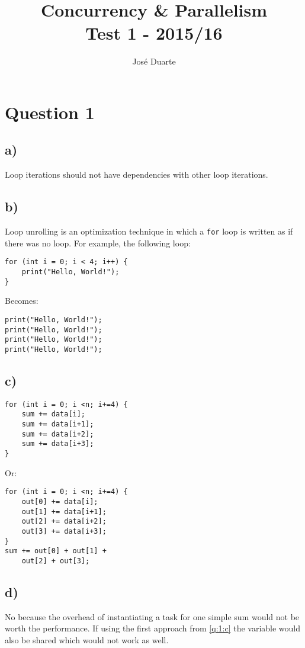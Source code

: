 \documentclass[a4paper, twocolumn]{article}
\author{José Duarte}
\title{Concurrency \& Parallelism\\Test 1 - 2015/16}
\begin{document}
\maketitle
\section{Question 1}
\subsection{a)}
Loop iterations should not have dependencies with other loop iterations.

\subsection{b)}
Loop unrolling is an optimization technique in which a \texttt{for} loop is written as if there was no loop.
For example, the following loop:
\begin{lstlisting}
for (int i = 0; i < 4; i++) {
    print("Hello, World!");
}
\end{lstlisting}
Becomes:
\begin{lstlisting}
print("Hello, World!");
print("Hello, World!");
print("Hello, World!");
print("Hello, World!");
\end{lstlisting}

\subsection{c)}\label{q:1:c}
\begin{lstlisting}
for (int i = 0; i <n; i+=4) {
    sum += data[i];
    sum += data[i+1];
    sum += data[i+2];
    sum += data[i+3];
}
\end{lstlisting}
Or:
\begin{lstlisting}
for (int i = 0; i <n; i+=4) {
    out[0] += data[i];
    out[1] += data[i+1];
    out[2] += data[i+2];
    out[3] += data[i+3];
}
sum += out[0] + out[1] +
    out[2] + out[3];
\end{lstlisting}

\subsection{d)}
No because the overhead of instantiating a task for one simple sum would not be worth the performance.
If using the first approach from \autoref{q:1:c} the variable would also be shared which would not work as well.
\end{document}
